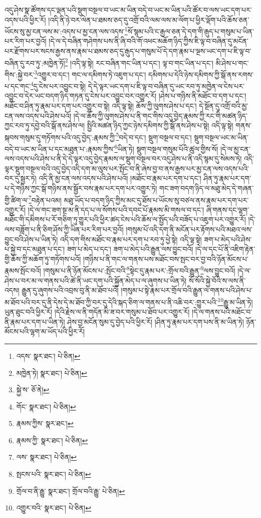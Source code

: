 འདུ་ཤེས་སྣ་ཚོགས་དང་ལྡན་པའི་སྡུག་བསྔལ་བ་ཡང་མ་ཡིན་བདེ་བ་ཡང་མ་ཡིན་པའི་ཚོར་བ་ལས་ཡང་དག་པར་འདས་པའི་ཕྱིར་རོ། །འདི་ནི་ཉེ་བར་ལེན་པ་ཐམས་ཅད་དུ་འགྲོ་བའི་ལམ་ལས་མ་ལོག་པ་ཕྱིར་ལྡོག་པའི་ཆོས་ཅན་ཡོངས་སུ་མྱ་ངན་ལས་མ་:འདས་པ་མྱ་ངན་ལས་འདས་\footnote{འདས་  སྣར་ཐང་།  པེ་ཅིན། }སོ་སྙམ་པའི་ང་རྒྱལ་ཅན་དེ་དག་གི་རྒུད་པ་གསུམ་པ་ཡིན་པར་རིག་པར་བྱའོ། །དེ་ལ་དེ་བཞིན་གཤེགས་པས་ནི་ཞི་བའི་གོ་འཕང་མཆོག་ཉིད་ཀྱིས་ཇི་ལྟ་བ་བཞིན་དུ་མངོན་པར་རྫོགས་པར་སངས་རྒྱས་ནས་རྣམ་པ་ཐམས་ཅད་དུ་རྒུད་པ་གསུམ་པོ་དེ་དག་རྣམ་པ་ལྔས་ཡང་དག་པ་ཇི་ལྟ་བ་བཞིན་དུ་རབ་ཏུ་:མཁྱེན་ཏོ།\footnote{མཁྱེན་ཏེ།  སྣར་ཐང་།  པེ་ཅིན། } །འདི་ལྟ་སྟེ། རང་བཞིན་གང་ཡིན་པ་དང་། ལྟ་བ་གང་ཡིན་པ་དང་། མི་ཤེས་པ་གང་གིས་:སྐྱེ་བར་\footnote{སྐྱེ་ས་  ཅོ་ནེ། }འགྱུར་བ་དང་། གང་ལ་དམིགས་ཏེ་འཇུག་པ་དང་། དམིགས་པ་དེའི་ཉེས་དམིགས་ཀྱི་སྒོ་ནས་རགས་པ་དང་གང་\footnote{གོང་  སྣར་ཐང་།  པེ་ཅིན། }དུ་ངེས་པར་འབྱུང་བ་སྟེ། དེ་དེ་ལྟར་ཡང་དག་པ་ཇི་ལྟ་བ་བཞིན་དུ་ཡང་རབ་ཏུ་མཁྱེན་ལ་ངེས་པར་འབྱུང་བ་དེར་ཡང་བདག་ཉིད་གཏན་དུ་ངེས་པར་འབྱུང་བར་འགྱུར་རོ། །ཤེས་པ་གཉིས་ནི་མཐོང་བ་དག་པ་དང་། མཐོང་བ་ཤིན་ཏུ་རྣམ་པར་དག་པར་འགྱུར་བ་སྟེ། འདི་ལྟ་སྟེ། ཆོས་ཀྱི་ལུགས་ཤེས་པ་དང་། དེ་སྔོན་དུ་འགྲོ་བའི་མྱ་ངན་ལས་འདས་པའི་ཤེས་པའོ། །དེ་ལ་ཆོས་ཀྱི་ལུགས་ཤེས་པ་ནི་གང་གིས་འདུ་བྱེད་རྣམས་ཀྱི་རང་གི་མཚན་ཉིད་ཀྱང་རབ་ཏུ་དབྱེ་བའི་སྒོ་ནས་ཤེས་ལ། སྤྱིའི་མཚན་ཉིད་ཀྱང་ཉེས་དམིགས་ཀྱི་སྒོ་ནས་ཤེས་པ་སྟེ། འདི་ལྟ་སྟེ། གནས་སྐབས་གསུམ་དུ་གཏོགས་པའི་འདུ་བྱེད་:རྣམས་ཀྱི་\footnote{རྣམས་ཀྱིས་  སྣར་ཐང་། }བདེ་བ་དང་། སྡུག་བསྔལ་བ་དང་། སྡུག་བསྔལ་ཡང་མ་ཡིན་བདེ་བ་ཡང་མ་ཡིན་པ་དང་མཐུན་པ་:རྣམས་ཀྱིས་\footnote{རྣམས་ཀྱི་  སྣར་ཐང་།  པེ་ཅིན། }ཡིན་ཏེ། སྡུག་བསྔལ་གསུམ་པོའི་ཚུལ་གྱིས་སོ། །དེ་ལ་མྱ་ངན་ལས་འདས་པའི་ཤེས་པ་ནི་དེ་དེ་ལྟར་འདུ་བྱེད་རྣམས་ལ་སྡུག་བསྔལ་བར་འདུ་ཤེས་པ་ནི་འདི་སྙམ་དུ་སེམས་ཏེ། འདི་ལྟར་སྡུག་བསྔལ་བའི་འདུ་བྱེད་འདི་དག་མ་ལུས་པར་སྤོང་བ་ནི་ཞེས་བྱ་བ་ནས་རྒྱས་པར་མྱ་ངན་ལས་འདས་པའི་བར་དུ་སྦྱར་ཏེ། འདི་ནི་མྱ་ངན་ལས་འདས་པའི་ཤེས་པའོ། །མཐོང་བ་རྣམ་པར་དག་པ་དང་། ཤིན་ཏུ་རྣམ་པར་དག་པ་དེ་གཉིས་ཀྱང་སྒོ་གཉིས་ནས་སྦྱོར་བས་རྣམ་པར་དག་པར་འགྱུར་ཏེ། གང་ཟག་བདག་ཉིད་ལ་མཐུ་མེད་དེ་གཞན་གྱི་ཚིག་ལ་\footnote{ལས་  སྣར་ཐང་།  པེ་ཅིན། }བརྟེན་པའམ། མཐུ་ཡོད་པ་བདག་ཉིད་ཀྱིས་མང་དུ་ཐོས་པ་ཡོངས་སུ་བཙལ་ནས་རྣམ་པར་དག་པར་འགྱུར་རོ། །དེ་ལ་གང་ཟག་སྔ་མ་ནི་དད་པ་ལ་སོགས་པའི་དབང་པོ་རྣམས་མི་གསལ་བ་དང་། ཞི་གནས་དང་ལྷག་མཐོང་གི་དམིགས་པ་རོ་གཅིག་ཏུ་གྱུར་པའི་ཕྱིར་ཚད་ངེས་པའི་ཆོས་ལ་སྤྱོད་པའི་བཟོད་པ་འཇུག་པར་འགྱུར་རོ། །དེ་ལས་བཟློག་པ་ནི་ཅིག་ཤོས་ཀྱི་ཡིན་པར་རིག་པར་བྱའོ། །གསུམ་པོ་འདི་དག་ནི་མངོན་པར་རྟོགས་པའི་མཐའ་ལས་བྱུང་བའི་ཤེས་པ་ཡིན་ཏེ། འདི་དག་གིས་མཐོང་བ་རྣམ་པར་དག་པ་རབ་ཏུ་ཕྱེ་སྟེ། འདི་ལྟ་སྟེ། ཟག་པ་མེད་པའི་ཤེས་པ་སྐྱེ་བ་དང་མཐུན་པ་དང་། ཟག་པ་མེད་པ་དང་། ཟག་པ་མེད་པའི་རྒྱུན་ལས་བྱུང་བའོ། །དེ་ལ་དང་པོ་ནི་འཇིག་རྟེན་གྱི་ཆོས་ཀྱི་མཆོག་ཏུ་གཏོགས་པའོ། །གཉིས་པ་ནི་གང་ལ་གནས་པས་མཐོང་བས་སྤང་བར་བྱ་བའི་ཉོན་མོངས་པ་རྣམས་སྤོང་བའོ། །གསུམ་པ་ནི་ཉོན་མོངས་པ་:སྤོང་བའི་\footnote{སྤངས་པའི་  སྣར་ཐང་།  པེ་ཅིན། }སྟེང་དུ་རྣམ་པར་:གྲོལ་བའི་རྒྱུན་\footnote{གྲོལ་བ་ནི་རྒྱུ་  སྣར་ཐང་། གྲོལ་བའི་རྒྱུ་  པེ་ཅིན། }ལས་བྱུང་བའོ། །དེ་ལ་ཤེས་པ་བར་མ་ལ་གནས་པའི་ཚེ་ནི་ཡང་དག་པའི་སྐྱོན་མེད་པ་ལ་ཞུགས་པ་ཡིན་ཏེ། སོ་སོའི་སྐྱེ་བོའི་ས་ལས་ནི་འདས། རྒྱུན་དུ་ཞུགས་པའི་འབྲས་བུ་ནི་མ་ཐོབ་པའོ། །གསུམ་པ་སྟེ་རྣམ་པར་གྲོལ་བའི་རྒྱུན་ལ་གནས་པའི་ཤེས་པ་མ་ཐོབ་པའི་བར་དུ་ནི་དེས་དེ་མ་ཐོབ་ཀྱི་བར་དུ་དེའི་སྐད་ཅིག་ལ་གནས་པ་ནི་འཆི་བར་:གྱུར་པའི་\footnote{འགྱུར་བའི་  སྣར་ཐང་།  པེ་ཅིན། }རྒྱུ་མ་ཡིན་ཏེ། ཡུན་ཐུང་བའི་ཕྱིར་རོ། །དེའི་རྗེས་ལ་ནི་གདོན་མི་ཟ་བར་གསུམ་པ་ཐོབ་པར་འགྱུར་རོ། །དེ་ལ་གནས་པའི་མཐོང་བ་ནི་རྣམ་པར་དག་པ་ཡིན་ཏེ། ཤེས་བྱ་མངོན་སུམ་དུ་བྱེད་པའི་ཕྱིར་རོ། །ཤིན་ཏུ་རྣམ་པར་དག་པས་ནི་མ་ཡིན་ཏེ། ཉོན་མོངས་པའི་ལྷག་མ་ཡོད་པའི་ཕྱིར་རོ། 
